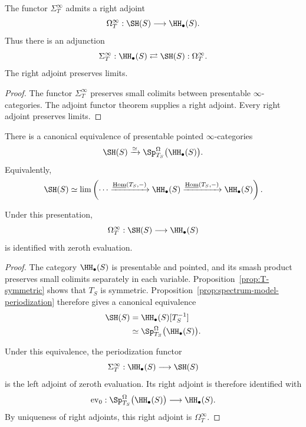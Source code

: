 \begin{proposition}
\label{prop:SigmaOmegaT-adjunction}
The functor $\Sigma_T^\infty$ admits a right adjoint
\[
    \Omega_T^\infty:
    \SH(S)
    \longrightarrow
    \HH_\bullet(S).
\]
Thus there is an adjunction
\[
    \Sigma_T^\infty:
    \HH_\bullet(S)
    \rightleftarrows
    \SH(S):\Omega_T^\infty.
\]
The right adjoint preserves limits.
\end{proposition}

\begin{proof}
The functor $\Sigma_T^\infty$ preserves small colimits between presentable $\infty$-categories.
The adjoint functor theorem supplies a right adjoint.  Every right adjoint preserves limits.
\end{proof}

\begin{proposition}
\label{prop:SH-spectrum-object-description}
There is a canonical equivalence of presentable pointed
\(\infty\)-categories
\[
    \SH(S)
    \xrightarrow{\simeq}
    \Sp_{T_S}^\Omega
    \bigl(
      \HH_\bullet(S)
    \bigr).
\]
Equivalently,
\[
    \SH(S)
    \simeq
    \lim
    \left(
      \cdots
      \xrightarrow{\underline{\operatorname{Hom}}(T_S,-)}
      \HH_\bullet(S)
      \xrightarrow{\underline{\operatorname{Hom}}(T_S,-)}
      \HH_\bullet(S)
    \right).
\]

Under this presentation,
\[
    \Omega_T^\infty:
    \SH(S)
    \longrightarrow
    \HH_\bullet(S)
\]
is identified with zeroth evaluation.
\end{proposition}

\begin{proof}
The category \(\HH_\bullet(S)\) is presentable and pointed, and its smash
product preserves small colimits separately in each variable.
Proposition~\ref{prop:T-symmetric} shows that \(T_S\) is symmetric.
Proposition~\ref{prop:spectrum-model-periodization} therefore gives a
canonical equivalence
\[
\begin{aligned}
    \SH(S)
    &=
    \HH_\bullet(S)[T_S^{-1}] \\
    &\simeq
    \Sp_{T_S}^\Omega
    \bigl(
      \HH_\bullet(S)
    \bigr).
\end{aligned}
\]

Under this equivalence, the periodization functor
\[
    \Sigma_T^\infty:
    \HH_\bullet(S)
    \longrightarrow
    \SH(S)
\]
is the left adjoint of zeroth evaluation.  Its right adjoint is therefore
identified with
\[
    \operatorname{ev}_0:
    \Sp_{T_S}^\Omega
    \bigl(
      \HH_\bullet(S)
    \bigr)
    \longrightarrow
    \HH_\bullet(S).
\]
By uniqueness of right adjoints, this right adjoint is
\(\Omega_T^\infty\).
\end{proof}

